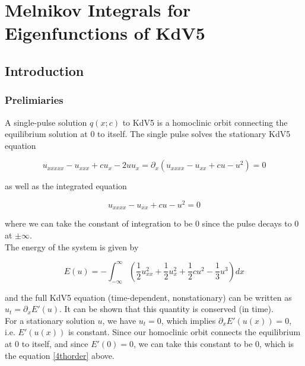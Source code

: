 \documentclass[12pt]{article}
\begin{document}
\section*{Melnikov Integrals for Eigenfunctions of KdV5}

\subsection*{Introduction}

\subsubsection*{Prelimiaries}

A single-pulse solution $q(x; c)$ to KdV5 is a homoclinic orbit connecting the equilibrium solution at 0 to itself. The single pulse solves the stationary KdV5 equation

\begin{equation}
u_{xxxxx} - u_{xxx} + c u_x - 2 u u_x = \partial_x(u_{xxxx} - u_{xx} + c u - u^2) = 0
\end{equation}

as well as the integrated equation

\begin{equation}\label{4thorder}
u_{xxxx} - u_{xx} + c u - u^2 = 0
\end{equation}

where we can take the constant of integration to be 0 since the pulse decays to 0 at $\pm \infty$. \\

The energy of the system is given by 

\begin{equation} \label{energy}
E(u) = -\int_{-\infty}^{\infty} \left( \frac{1}{2}u_{xx}^2 + \frac{1}{2}u_x^2 + \frac{1}{2}cu^2 - \frac{1}{3}u^3 \right) dx
\end{equation}

and the full KdV5 equation (time-dependent, nonstationary) can be written as $u_t = \partial_x E'(u)$. It can be shown that this quantity is conserved (in time).\\

For a stationary solution $u$, we have $u_t = 0$, which implies $\partial_x E'(u(x)) = 0$, i.e. $E'(u(x))$ is constant. Since our homoclinic orbit connects the equilibrium at 0 to itself, and since $E'(0) = 0$, we can take this constant to be 0, which is the equation \eqref{4thorder} above. \\
\end{document}
